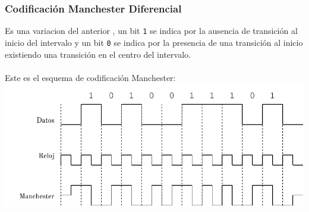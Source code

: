 \subsubsection*{Codificación Manchester Diferencial}
Es una variacion del anterior , un bit \texttt{1} se indica por la ausencia de transición al inicio del intervalo y un bit \texttt{0} se indica por la presencia de una transición al inicio existiendo una transición en el centro del intervalo.
\\ ${ }$\\
Este es el esquema de codificación Manchester: \\
\pagebreak
\includegraphics[page=1,scale=0.9]{Manchester.pdf}


